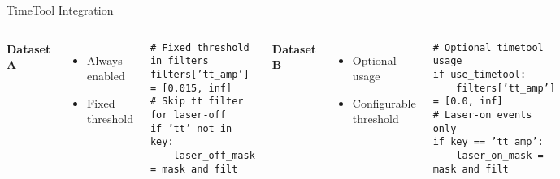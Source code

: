 \documentclass{beamer}
\begin{document}
\begin{frame}{TimeTool Integration}
\begin{columns}
\textbf{Dataset A}
\begin{itemize}
\item Always enabled
\item Fixed threshold
\end{itemize}

\texttt{\# Fixed threshold in filters}\\
\texttt{filters['tt\_amp'] = [0.015, inf]}\\
\vspace{0.5cm}
\texttt{\# Skip tt filter for laser-off}\\
\texttt{if 'tt' not in key:}\\
\texttt{~~~~laser\_off\_mask = mask and filt}

\textbf{Dataset B}
\begin{itemize}
\item Optional usage
\item Configurable threshold
\end{itemize}

\texttt{\# Optional timetool usage}\\
\texttt{if use\_timetool:}\\
\texttt{~~~~filters['tt\_amp'] = [0.0, inf]}\\
\vspace{0.5cm}
\texttt{\# Laser-on events only}\\
\texttt{if key == 'tt\_amp':}\\
\texttt{~~~~laser\_on\_mask = mask and filt}
\end{columns}
\end{frame}
\end{document}
